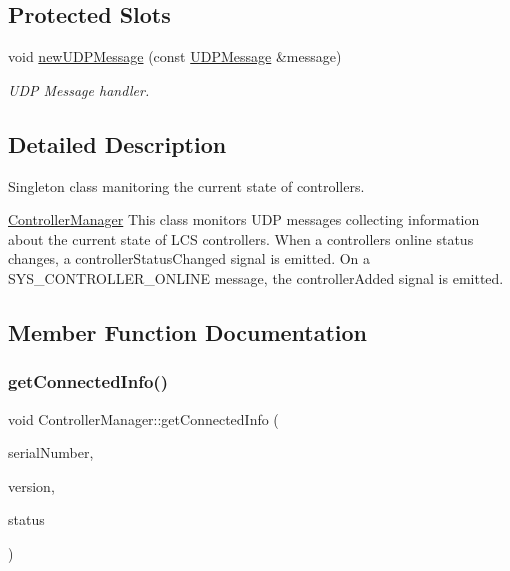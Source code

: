 \subsection*{Protected Slots}
\begin{DoxyCompactItemize}
\item 
\mbox{\label{class_controller_manager_a5e9480ad4b88ff536ab60dbc9cb6619f}} 
void \hyperlink{class_controller_manager_a5e9480ad4b88ff536ab60dbc9cb6619f}{new\+U\+D\+P\+Message} (const \hyperlink{class_u_d_p_message}{U\+D\+P\+Message} \&message)
\begin{DoxyCompactList}\small\item\em U\+DP Message handler. \end{DoxyCompactList}\end{DoxyCompactItemize}


\subsection{Detailed Description}
Singleton class manitoring the current state of controllers. 

\hyperlink{class_controller_manager}{Controller\+Manager} This class monitors U\+DP messages collecting information about the current state of L\+CS controllers. When a controller\textquotesingle{}s online status changes, a controller\+Status\+Changed signal is emitted. On a S\+Y\+S\+\_\+\+C\+O\+N\+T\+R\+O\+L\+L\+E\+R\+\_\+\+O\+N\+L\+I\+NE message, the controller\+Added signal is emitted. 

\subsection{Member Function Documentation}
\mbox{\label{class_controller_manager_a09aae80f5783ab2cb0da0ba39144ddf6}} 
\subsubsection{\texorpdfstring{get\+Connected\+Info()}{getConnectedInfo()}}
{\footnotesize\ttfamily void Controller\+Manager\+::get\+Connected\+Info (\begin{DoxyParamCaption}\item[{long}]{serial\+Number,  }\item[{Q\+String \&}]{version,  }\item[{\hyperlink{_global_defs_8h_a51207b6a49e0da6f9978a3019d93480a}{Controller\+Status\+Enum} \&}]{status }\end{DoxyParamCaption})}

